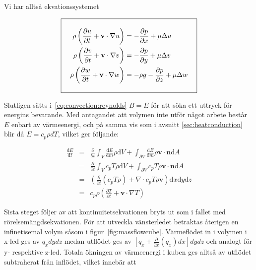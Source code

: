 
Vi har alltså ekvationssystemet

\begin{equation}
\label{eq:convection:momentum}
\addtolength{\fboxsep}{10pt} 
\boxed{ 
\begin{aligned} 
\rho\left(\frac{\partial u}{\partial t} + \mathbf{v}\cdot \nabla u\right) & = -\frac{\partial p}{\partial x} + \mu\Delta u\\
\rho\left(\frac{\partial v}{\partial t} + \mathbf{v}\cdot \nabla v\right) & = -\frac{\partial p}{\partial y} + \mu\Delta v\\
\rho\left(\frac{\partial w}{\partial t} + \mathbf{v}\cdot \nabla w\right) & = -\rho g -\frac{\partial p}{\partial z} + \mu\Delta w  
\end{aligned} 
} 
\end{equation}


Slutligen sätts i~\ref{eq:convection:reynolds} $B=E$ för att söka ett uttryck för energins bevarande. Med antagandet att volymen inte utför något arbete består $E$ enbart av värmeenergi, och på samma vis som i avsnitt
\ref{sec:heatconduction} blir då $E = c_p \rho dT$, vilket ger följande:

\begin{eqnarray}
\label{reynoldsenergyone}
\frac{\mathrm{d}E}{\mathrm{d}t} & = & \frac{\partial}{\partial t} \int_V \frac{\mathrm{d}E}{\mathrm{d}m}\rho \mathrm{d}V + \int_{\partial V}\frac{\mathrm{d}E}{\mathrm{d}m}\rho \mathbf{v} \cdot \mathbf{n} \mathrm{d}A \nonumber\\
& = & \frac{\partial}{\partial t} \int_V c_p T \rho \mathrm{d}V + \int_{\partial V} c_p T \rho \mathbf{v} \cdot \mathbf{n} \mathrm{d}A \nonumber\\
& = & \left(\frac{\partial}{\partial t} \left( c_p T \rho \right) + \nabla\cdot c_p T \rho \mathbf{v}\right) \mathrm{d}x\mathrm{d}y\mathrm{d}z \nonumber\\
& = & c_p \rho \left( \frac{\partial T}{\partial t} + \mathbf{v}\cdot \nabla T\right)
\end{eqnarray}

Sista steget följer av att kontinuitetsekvationen bryts ut som i fallet med rörelsemängdsekvationen. För att utveckla vänsterledet betraktas återigen en infinetisemal volym såsom i figur~\ref{fig:massflowcube}. Värmeflödet in i volymen i x-led ges av $q_x dy dz$ medan utflödet ges av $\left[ q_x + \frac{\partial}{\partial x} \left( q_x\right)dx\right]dydz$ och analogt för y- respektive z-led. Totala ökningen av värmeenergi i kuben ges alltså av utflödet subtraherat från inflödet, vilket innebär att

